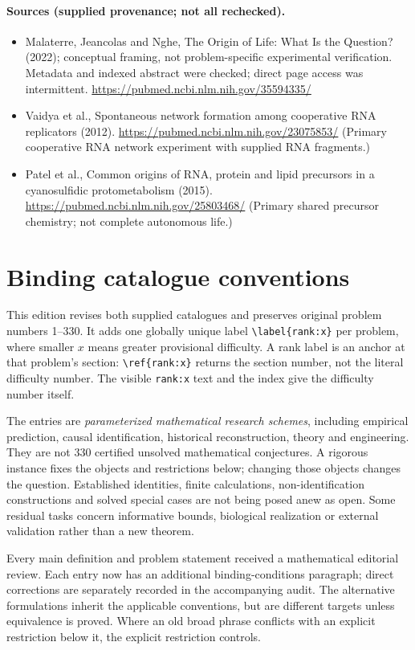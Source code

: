 \documentclass[11pt]{article}
\begin{document}
\paragraph{Sources (supplied provenance; not all rechecked).} \begin{itemize}
\item Malaterre, Jeancolas and Nghe, The Origin of Life: What Is the Question? (2022); conceptual framing, not problem-specific experimental verification. Metadata and indexed abstract were checked; direct page access was intermittent. \url{https://pubmed.ncbi.nlm.nih.gov/35594335/}
\item Vaidya et al., Spontaneous network formation among cooperative RNA replicators (2012). \url{https://pubmed.ncbi.nlm.nih.gov/23075853/} (Primary cooperative RNA network experiment with supplied RNA fragments.)
\item Patel et al., Common origins of RNA, protein and lipid precursors in a cyanosulfidic protometabolism (2015). \url{https://pubmed.ncbi.nlm.nih.gov/25803468/} (Primary shared precursor chemistry; not complete autonomous life.)
\end{itemize}


\section*{Binding catalogue conventions}
This edition revises both supplied catalogues and preserves original problem numbers 1--330. It adds one globally unique label \verb|\label{rank:x}| per problem, where smaller $x$ means greater provisional difficulty. A rank label is an anchor at that problem's section: \verb|\ref{rank:x}| returns the section number, not the literal difficulty number. The visible \texttt{rank:x} text and the index give the difficulty number itself.

The entries are \emph{parameterized mathematical research schemes}, including empirical prediction, causal identification, historical reconstruction, theory and engineering. They are not 330 certified unsolved mathematical conjectures. A rigorous instance fixes the objects and restrictions below; changing those objects changes the question. Established identities, finite calculations, non-identification constructions and solved special cases are not being posed anew as open. Some residual tasks concern informative bounds, biological realization or external validation rather than a new theorem.

Every main definition and problem statement received a mathematical editorial review. Each entry now has an additional binding-conditions paragraph; direct corrections are separately recorded in the accompanying audit. The alternative formulations inherit the applicable conventions, but are different targets unless equivalence is proved. Where an old broad phrase conflicts with an explicit restriction below it, the explicit restriction controls.
\end{document}

